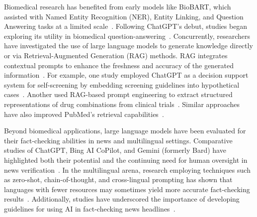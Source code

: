 Biomedical research has benefited from early models like BioBART, which assisted with Named Entity Recognition (NER), Entity Linking, and Question Answering tasks at a limited scale~\cite{yuan2022BioBART}. Following ChatGPT’s debut, studies began exploring its utility in biomedical question-answering~\cite{jin2023retrieve,hou2023answers}. Concurrently, researchers have investigated the use of large language models to generate knowledge directly or via Retrieval-Augmented Generation (RAG) methods. RAG integrates contextual prompts to enhance the freshness and accuracy of the generated information~\cite{huly2024old,jeong2023generative,arslan2024business,ng2024rag}. For example, one study employed ChatGPT as a decision support system for self-screening by embedding screening guidelines into hypothetical cases~\cite{khan10803468MedAI}. Another used RAG-based prompt engineering to extract structured representations of drug combinations from clinical trials~\cite{Hamed10803434MedAI}. Similar approaches have also improved PubMed’s retrieval capabilities~\cite{thomo2024pubmed}.

Beyond biomedical applications, large language models have been evaluated for their fact-checking abilities in news and multilingual settings. Comparative studies of ChatGPT, Bing AI CoPilot, and Gemini (formerly Bard) have highlighted both their potential and the continuing need for human oversight in news verification~\cite{chatgpt2025,copilot2025,gemini2025,caramancion2023news}. In the multilingual arena, research employing techniques such as zero-shot, chain-of-thought, and cross-lingual prompting has shown that languages with fewer resources may sometimes yield more accurate fact-checking results~\cite{singhal2024multilingual}. Additionally, studies have underscored the importance of developing guidelines for using AI in fact-checking news headlines~\cite{DeVerna_pnas_2322823121}.